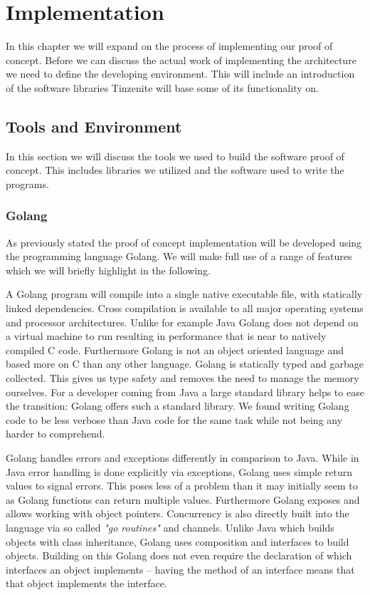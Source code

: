 \chapter{Implementation}
\label{chap:Implementation}

In this chapter we will expand on the process of implementing our proof of concept.
Before we can discuss the actual work of implementing the architecture we need to define the developing environment.
This will include an introduction of the software libraries Tinzenite will base some of its functionality on.

\section{Tools and Environment}
\label{sec:Tools and Environment}

In this section we will discuss the tools we used to build the software proof of concept.
This includes libraries we utilized and the software used to write the programs.

\subsection{Golang}
\label{sub:Golang}

As previously stated the proof of concept implementation will be developed using the programming language Golang.
We will make full use of a range of features which we will briefly highlight in the following.

A Golang program will compile into a single native executable file, with statically linked dependencies.
Cross compilation is available to all major operating systems and processor architectures.
Unlike for example Java Golang does not depend on a virtual machine to run resulting in performance that is near to natively compiled C code.
Furthermore Golang is not an object oriented language and based more on C than any other language.
Golang is statically typed and garbage collected.
This gives us type safety and removes the need to manage the memory ourselves.
For a developer coming from Java a large standard library helps to ease the transition: Golang offers such a standard library.
We found writing Golang code to be less verbose than Java code for the same task while not being any harder to comprehend.

Golang handles errors and exceptions differently in comparison to Java.
While in Java error handling is done explicitly via exceptions, Golang uses simple return values to signal errors.
This poses less of a problem than it may initially seem to as Golang functions can return multiple values.
Furthermore Golang exposes and allows working with object pointers.
Concurrency is also directly built into the language via so called \textit{"go routines"} and channels.
Unlike Java which builds objects with class inheritance, Golang uses composition and interfaces to build objects.
Building on this Golang does not even require the declaration of which interfaces an object implements -- having the method of an interface means that that object implements the interface.

